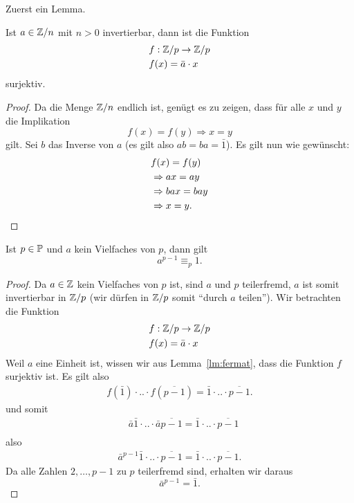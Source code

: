 Zuerst ein Lemma.
\begin{lm}\label{lm:fermat}
Ist $a\in\Z/n$ mit $n>0$ invertierbar, dann ist die Funktion
\begin{align*}
f&:\Z/p\to\Z/p\\
f&(x)=\bar a\cdot x
\end{align*}
surjektiv.
\end{lm}
\begin{proof}
Da die Menge $\Z/n$ endlich ist, genügt es zu zeigen, dass für alle $x$ und $y$ die Implikation
\[
f(x)=f(y)\Rightarrow x= y
\]
gilt. Sei $b$ das Inverse von $a$ (es gilt also $ab=ba=\bar 1$). Es gilt nun wie gewünscht:
\begin{align*}
&f(x)=f(y)\\
&\Rightarrow ax=ay\\
&\Rightarrow bax=bay\\
&\Rightarrow x= y. \qedhere
\end{align*}
\end{proof}
\begin{satz}
Ist $p\in\P$ und $a$ kein Vielfaches von $p$, dann gilt
\[
a^{p-1}\equiv_p1.
\]
\begin{proof}
Da $a\in\Z$ kein Vielfaches von $p$ ist, sind $a$ und $p$ teilerfremd, $a$ ist somit invertierbar in $\Z/p$ (wir dürfen in $\Z/p$ somit ``durch $a$ teilen''). Wir betrachten die Funktion
\begin{align*}
f&:\Z/p\to\Z/p\\
f&(x)=\bar a\cdot x
\end{align*}
Weil $a$ eine Einheit ist, wissen wir aus Lemma~\ref{lm:fermat}, dass die Funktion $f$ surjektiv ist. Es gilt also
\begin{align*}
f(\bar 1)\cdot.. \cdot f(\overline{p-1})=\bar 1\cdot..\cdot \overline{p-1}.
\end{align*}
und somit
\begin{align*}
&\bar a\bar 1\cdot.. \cdot \bar a\overline{p-1}=\bar 1\cdot..\cdot \overline{p-1}\\
\end{align*}
also
\begin{align*}
\bar a^{p-1}\bar 1\cdot.. \cdot \overline{p-1}=\bar 1\cdot..\cdot \overline{p-1}.
\end{align*}
Da alle Zahlen $2,\dots,p-1$ zu $p$ teilerfremd sind, erhalten wir daraus
\[
\bar a^{p-1}=\bar 1.
\]
\end{proof}
\end{satz}
